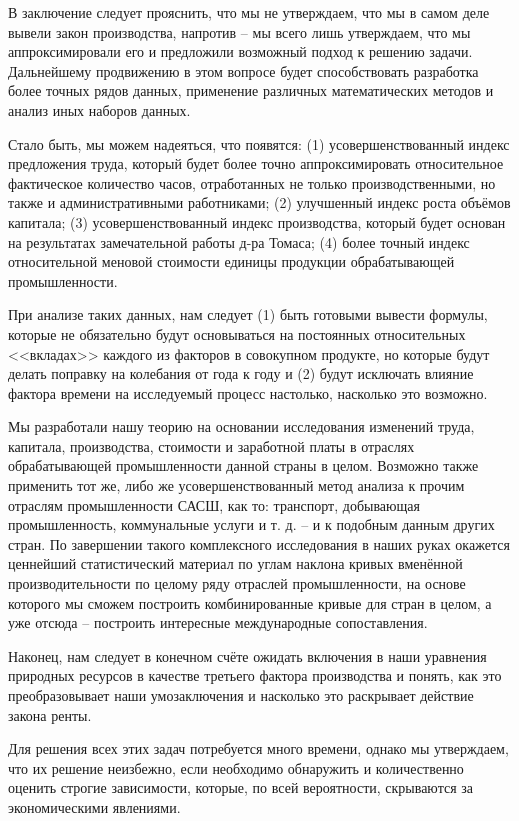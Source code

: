 \documentclass[leqno]{article}  %
\begin{document}
В заключение следует прояснить, что мы не утверждаем, что мы в самом деле вывели закон производства,
напротив -- мы всего лишь утверждаем, что мы аппроксимировали его и предложили возможный подход к решению задачи. Дальнейшему продвижению в этом вопросе будет способствовать разработка более точных рядов данных, применение различных математических методов и анализ иных наборов данных.
\par
Стало быть, мы можем надеяться, что появятся: (1) усовершенствованный индекс предложения труда, который будет более точно аппроксимировать относительное фактическое количество часов, отработанных не только производственными, но также и административными работниками; (2) улучшенный индекс роста объёмов капитала; (3) усовершенствованный индекс производства, который будет основан на результатах замечательной работы д-ра Томаса; (4) более точный индекс относительной меновой стоимости единицы продукции обрабатывающей промышленности.
\par
При анализе таких данных, нам следует (1) быть готовыми вывести формулы, которые не обязательно будут основываться на постоянных относительных <<вкладах>> каждого из факторов в совокупном продукте, но которые будут делать поправку на колебания от года к году и (2) будут исключать влияние фактора времени на исследуемый процесс настолько, насколько это возможно.
\par
Мы разработали нашу теорию на основании исследования изменений труда, капитала, производства, стоимости и заработной платы в отраслях обрабатывающей промышленности данной страны в целом. Возможно также применить тот же, либо же усовершенствованный метод анализа к прочим отраслям промышленности САСШ, как то: транспорт, добывающая промышленность, коммунальные услуги и т. д. -- и к подобным данным других стран. По завершении такого комплексного исследования в наших руках окажется ценнейший статистический материал по углам наклона кривых вменённой производительности по целому ряду отраслей промышленности, на основе которого мы сможем построить комбинированные кривые для стран в целом, а уже отсюда -- построить интересные международные сопоставления.
\par
Наконец, нам следует в конечном счёте ожидать включения в наши уравнения природных ресурсов в качестве третьего фактора производства и понять, как это преобразовывает наши умозаключения и насколько это раскрывает действие закона ренты.
\par
Для решения всех этих задач потребуется много времени, однако мы утверждаем, что их решение неизбежно, если необходимо обнаружить и количественно оценить строгие зависимости, которые, по всей вероятности, скрываются за экономическими явлениями.
\end{document}
